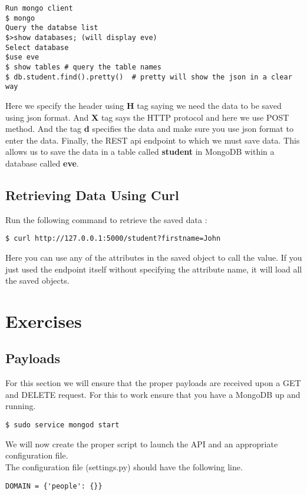 \documentclass{article}
\begin{document}
\begin{verbatim}
Run mongo client
$ mongo
Query the databse list
$>show databases; (will display eve)  
Select database
$use eve  
$ show tables # query the table names
$ db.student.find().pretty()  # pretty will show the json in a clear way
\end{verbatim}

\newline

Here we specify the header using \textbf{H} tag saying we need the
data to be saved using json format. And \textbf{X} tag says the HTTP
protocol and here we use POST method. And the tag \textbf{d} specifies
the data and make sure you use json format to enter the data. Finally,
the REST api endpoint to which we must save data. This allows us to
save the data in a table called \textbf{student} in MongoDB within a
database called \textbf{eve}.

\subsection{Retrieving Data Using Curl}

Run the following command to retrieve the saved data :

\begin{verbatim}
$ curl http://127.0.0.1:5000/student?firstname=John
\end{verbatim}



\newline

Here you can use any of the attributes in the saved object to call the
value. If you just used the endpoint itself without specifying the
attribute name, it will load all the saved objects.

\section{Exercises}
\subsection{Payloads}
For this section we will ensure that the proper payloads are received
upon a GET and DELETE request. For this to work ensure that you have a
MongoDB up and running.
\begin{verbatim}
$ sudo service mongod start
\end{verbatim}

We will now create the proper script to launch the API and an
appropriate configuration file. \\ The configuration file
(settings.py) should have the following line.
\begin{verbatim}
DOMAIN = {'people': {}}
\end{verbatim}
\end{document}
